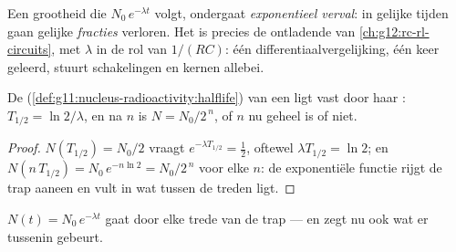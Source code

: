 \begin{definition}\label{def:g12:radioactive-decay:exponential}
Een grootheid die $N_0\,e^{-\lambda t}$ volgt, ondergaat \emph{exponentieel
verval}: in gelijke tijden gaan gelijke
\emph{fracties} verloren. Het is precies de ontladende  van
\cref{ch:g12:rc-rl-circuits}, met $\lambda$ in de rol van $1/(RC)$: één
differentiaalvergelijking, één keer geleerd, stuurt schakelingen en kernen
allebei.
\end{definition}

\begin{proposition}[Halveringstijd]\label{prop:g12:radioactive-decay:halflife}
De  (\cref{def:g11:nucleus-radioactivity:halflife}) van een
 ligt vast door haar : $T_{1/2} = \ln 2/\lambda$, en na
$n$  is $N = N_0/2^{\,n}$, of $n$ nu geheel is of niet.
\end{proposition}

\begin{proof}
$N(T_{1/2}) = N_0/2$ vraagt $e^{-\lambda T_{1/2}} = \tfrac12$, oftewel
$\lambda T_{1/2} = \ln 2$; en $N(n\,T_{1/2}) = N_0\,e^{-n\ln 2} =
N_0/2^{\,n}$ voor elke $n$: de exponentiële functie rijgt de trap aaneen en
vult in wat tussen de treden ligt.
\end{proof}

\begin{omfigure}

{\small $N(t) = N_0\,e^{-\lambda t}$ gaat door elke trede van de trap --- en
zegt nu ook wat er tussenin gebeurt.}
\end{omfigure}

